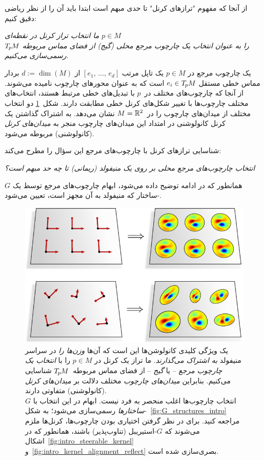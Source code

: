 از آنجا که مفهوم "ترازهای کرنل" تا حدی مبهم است
ابتدا باید آن را از نظر ریاضی دقیق کنیم:

\begin{minipage}{\textwidth}
	\begin{center}\it
		ما انتخاب تراز کرنل در نقطه‌ای $p\in M$ \\
		را به عنوان انتخاب یک چارچوب مرجع محلی (گیج)
		از فضای مماس مربوطه $T_{\mkern-1.5mu p}\mkern-.5muM$ رسمی‌سازی می‌کنیم.
	\end{center}
\end{minipage}

یک چارچوب مرجع در $p\in M$ یک تاپل مرتب $[e_1,\, \dots,\, e_d]$ از $d := \dim(M)$ بردار مماس خطی مستقل $e_i \in T_{\mkern-1.5mu p}\mkern-.5muM$ است که به عنوان محورهای چارچوب نامیده می‌شوند.
از آنجا که چارچوب‌های مختلف در~$p$ با تبدیل‌های خطی مرتبط هستند، انتخاب‌های مختلف چارچوب‌ها با تغییر شکل‌های کرنل خطی مطابقت دارند.
شکل~\ref{fig:intro_kernel_alignment_trivial} دو انتخاب مختلف از میدان‌های چارچوب را در~$M = \mathbb{R}^2$ نشان می‌دهد.
به اشتراک گذاشتن یک کرنل کانولوشنی در امتداد این میدان‌های چارچوب منجر به \emph{میدان‌های کرنل} (کانولوشنی) مربوطه می‌شود.


شناسایی ترازهای کرنل با چارچوب‌های مرجع این سؤال را مطرح می‌کند:
\begin{center}\it
	انتخاب چارچوب‌های مرجع محلی بر روی یک منیفولد (ریمانی) تا چه حد مبهم است؟
\end{center}
همانطور که در ادامه توضیح داده می‌شود، ابهام چارچوب‌های مرجع توسط یک $G$-ساختار که منیفولد به آن مجهز است، تعیین می‌شود.


\begin{figure}
	\centering
	\includegraphics[width=.62\textwidth]{figures/intro_kernel_alignment_trivial.pdf}
	\captionsetup{width=.9\textwidth}
	\caption{\small
		یک ویژگی کلیدی کانولوشن‌ها این است که آن‌ها \emph{وزن‌ها را} در سراسر منیفولد \emph{به اشتراک می‌گذارند}.
		ما تراز یک کرنل در $p\in M$ را با \emph{انتخاب یک چارچوب مرجع} – یا \emph{گیج} – از فضای مماس مربوطه~$T_{\mkern-1.5mu p}\mkern-.5muM$ شناسایی می‌کنیم.
		بنابراین \emph{میدان‌های چارچوب} مختلف دلالت بر \emph{میدان‌های کرنل} (کانولوشنی) متفاوتی دارند.
		\\[1ex]
		انتخاب چارچوب‌ها اغلب منحصر به فرد نیست.
		ابهام در این انتخاب با $G$-\emph{ساختارها} رسمی‌سازی می‌شود؛ به شکل~\ref{fig:G_structures_intro} مراجعه کنید.
		برای در نظر گرفتن اختیاری بودن چارچوب‌ها، کرنل‌ها ملزم می‌شوند که $G$-استیریبل (تناوب‌پذیر) باشند، همانطور که در اشکال~\ref{fig:intro_steerable_kernel} و~\ref{fig:intro_kernel_alignment_reflect} بصری‌سازی شده است.
		\\[0pt]
	}
	\label{fig:intro_kernel_alignment_trivial}
\end{figure}


